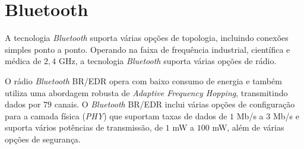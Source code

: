 \section{Bluetooth}
\label{sec:bluetooth}
A  tecnologia \emph{Bluetooth}  suporta várias opções de topologia, incluindo conexões simples ponto a ponto. Operando na faixa de frequência industrial, científica e médica de $2,4$ GHz, a tecnologia \emph{Bluetooth} suporta várias opções de rádio.

O rádio \emph{Bluetooth} BR/EDR opera com baixo consumo de energia e também utiliza uma abordagem robusta de \textit{Adaptive Frequency Hopping}, transmitindo dados por $79$ canais. O \textit{Bluetooth} BR/EDR inclui várias opções de configuração para a camada física (\emph{PHY}) que suportam taxas de dados de $1$ Mb/s a $3$ Mb/s e suporta vários potências de transmissão, de $1$ mW a $100$ mW, além de várias opções de segurança.
